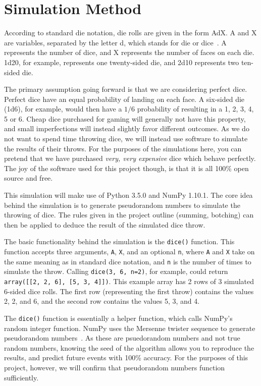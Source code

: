 \documentclass{article}
\begin{document}
\section{Simulation Method}
According to standard die notation, die rolls are given in the form AdX. A and X are variables, separated by the letter d, which stands for die or dice~\cite{dice_notation}. A represents the number of dice, and X represents the number of faces on each die. 1d20, for example, represents one twenty-sided die, and 2d10 represents two ten-sided die.

The primary assumption going forward is that we are considering perfect dice. Perfect dice have an equal probability of landing on each face. A six-sided die (1d6), for example, would then have a $1/6$ probability of resulting in a 1, 2, 3, 4, 5 or 6. Cheap dice purchased for gaming will generally not have this property, and small imperfections will instead slightly favor different outcomes. As we do not want to spend time throwing dice, we will instead use software to simulate the results of their throws. For the purposes of the simulations here, you can pretend that we have purchased \textit{very, very expensive} dice which behave perfectly. The joy of the software used for this project though, is that it is all 100\% open source and free.

This simulation will make use of Python 3.5.0 and NumPy 1.10.1. The core idea behind the simulation is to generate pseudorandom numbers to simulate the throwing of dice. The rules given in the project outline (summing, botching) can then be applied to deduce the result of the simulated dice throw.

The basic functionality behind the simulation is the \texttt{dice()} function. This function accepts three arguments, \texttt{A}, \texttt{X}, and an optional \texttt{n}, where \texttt{A} and \texttt{X} take on the same meaning as in standard dice notation, and \texttt{n} is the number of times to simulate the throw. Calling \texttt{dice(3, 6, n=2)}, for example, could return \texttt{array([[2, 2, 6], [5, 3, 4]])}. This example array has 2 rows of 3 simulated 6-sided dice rolls. The first row (representing the first throw) contains the values 2, 2, and 6, and the second row contains the values 5, 3, and 4.

The \texttt{dice()} function is essentially a helper function, which calls NumPy's random integer function. NumPy uses the Mersenne twister sequence to generate pseudorandom numbers~\cite{mersenne}. As these are psuedorandom numbers and not true random numbers, knowing the seed of the algorithm allows you to reproduce the results, and predict future events with 100\% accuracy. For the purposes of this project, however, we will confirm that pseudorandom numbers function sufficiently.
\end{document}
